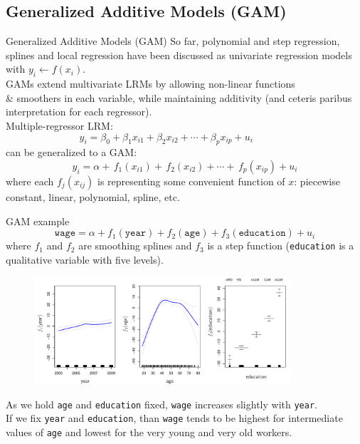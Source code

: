 \documentclass{beamer}
\begin{document}
\subsection{Generalized Additive Models (GAM)}
\begin{frame}{Generalized Additive Models (GAM)}
So far, polynomial and step regression, splines and local regression have been discussed as univariate regression models with $y_i \leftarrow f(x_i)$.\\
\medskip GAMs extend multivariate LRMs by allowing non-linear functions\\ \& smoothers in each variable, while maintaining additivity (and ceteris paribus interpretation for each regressor).\\ \medskip
Multiple-regressor LRM:
$$ y_i = \beta_0 + \beta_1 x_{i1} + \beta_2 x_{i2} + \cdots + \beta_p x_{ip} + u_i~~~~~~~~~~~~~~~~~$$
can be generalized to a GAM:
$$ y_i = \alpha + \, f_1(x_{i1}) + \, f_2(x_{i2}) + \cdots + \, f_p(x_{ip}) + u_i$$ 
where each $f_j(x_{ij})$ is representing some convenient function of $x$: piecewise constant, linear, polynomial, spline, etc.
\end{frame}
\begin{frame}{GAM example}
$$\texttt{wage} = \alpha + f_1(\texttt{year}) + f_2(\texttt{age}) + f_3(\texttt{education}) + u_i$$
\bigskip
where $f_1$ and $f_2$ are smoothing splines and $f_3$ is a step function (\texttt{education} is a qualitative variable with five levels).
\vspace{-0.2cm}
\begin{figure}
  \centering
  \includegraphics[trim=0cm 0cm 0cm 0cm, clip=true, width=0.85\textwidth]{IMG/ISLR712.pdf}
\end{figure}
\centering
\vspace{-0.3cm}
\tiny
As we hold \texttt{age} and \texttt{education} fixed, \texttt{wage} increases slightly with \texttt{year}.\\
If we fix \texttt{year} and \texttt{education}, than \texttt{wage} tends to be highest for intermediate \\values of  \texttt{age} and lowest for the very young and very old workers.
\end{frame}
\end{document}

